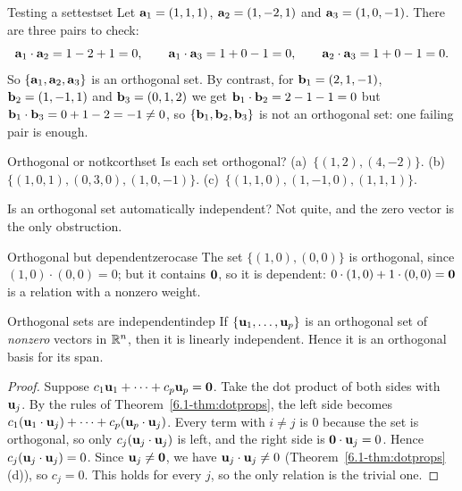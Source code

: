 \documentclass[11pt]{article}
\begin{document}
\begin{exmp}{Testing a set}{testset}
Let $\mathbf{a}_1=(1,1,1)$, $\mathbf{a}_2=(1,-2,1)$ and $\mathbf{a}_3=(1,0,-1)$. There are three pairs to check:
\[
\mathbf{a}_1\cdot\mathbf{a}_2=1-2+1=0,\qquad\mathbf{a}_1\cdot\mathbf{a}_3=1+0-1=0,\qquad\mathbf{a}_2\cdot\mathbf{a}_3=1+0-1=0 .
\]
So $\{\mathbf{a}_1,\mathbf{a}_2,\mathbf{a}_3\}$ is an orthogonal set. By contrast, for $\mathbf{b}_1=(2,1,-1)$, $\mathbf{b}_2=(1,-1,1)$ and $\mathbf{b}_3=(0,1,2)$ we get $\mathbf{b}_1\cdot\mathbf{b}_2=2-1-1=0$ but $\mathbf{b}_1\cdot\mathbf{b}_3=0+1-2=-1\neq0$, so $\{\mathbf{b}_1,\mathbf{b}_2,\mathbf{b}_3\}$ is not an orthogonal set: one failing pair is enough.
\end{exmp}

\begin{kc}{Orthogonal or not}{kcorthset}
Is each set orthogonal? (a)~$\{(1,2),(4,-2)\}$. (b)~$\{(1,0,1),(0,3,0),(1,0,-1)\}$. (c)~$\{(1,1,0),(1,-1,0),(1,1,1)\}$.
\end{kc}

Is an orthogonal set automatically independent? Not quite, and the zero vector is the only obstruction.

\begin{exmp}{Orthogonal but dependent}{zerocase}
The set $\{(1,0),(0,0)\}$ is orthogonal, since $(1,0)\cdot(0,0)=0$; but it contains $\mathbf{0}$, so it is dependent: $0\cdot(1,0)+1\cdot(0,0)=\mathbf{0}$ is a relation with a nonzero weight.
\end{exmp}

\begin{thm}{Orthogonal sets are independent}{indep}
If $\{\mathbf{u}_1,\dots,\mathbf{u}_p\}$ is an orthogonal set of \emph{nonzero} vectors in $\mathbb{R}^n$, then it is linearly independent. Hence it is an orthogonal basis for its span.
\end{thm}

\begin{proof}
Suppose $c_1\mathbf{u}_1+\cdots+c_p\mathbf{u}_p=\mathbf{0}$. Take the dot product of both sides with $\mathbf{u}_j$. By the rules of Theorem~\ref{6.1-thm:dotprops}, the left side becomes $c_1(\mathbf{u}_1\cdot\mathbf{u}_j)+\cdots+c_p(\mathbf{u}_p\cdot\mathbf{u}_j)$. Every term with $i\neq j$ is $0$ because the set is orthogonal, so only $c_j(\mathbf{u}_j\cdot\mathbf{u}_j)$ is left, and the right side is $\mathbf{0}\cdot\mathbf{u}_j=0$. Hence $c_j(\mathbf{u}_j\cdot\mathbf{u}_j)=0$. Since $\mathbf{u}_j\neq\mathbf{0}$, we have $\mathbf{u}_j\cdot\mathbf{u}_j\neq0$ (Theorem~\ref{6.1-thm:dotprops}(d)), so $c_j=0$. This holds for every $j$, so the only relation is the trivial one.
\end{proof}
\end{document}
